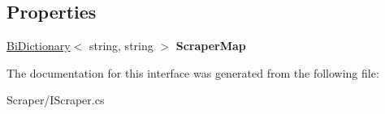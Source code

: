 \subsection*{Properties}
\begin{DoxyCompactItemize}
\item 
\hypertarget{interface_snowflake_1_1_scraper_1_1_i_scraper_a5b576c3bf032e77c6de722139b98cc15}{}\hyperlink{class_snowflake_1_1_utility_1_1_bi_dictionary}{Bi\+Dictionary}$<$ string, string $>$ {\bfseries Scraper\+Map}\label{interface_snowflake_1_1_scraper_1_1_i_scraper_a5b576c3bf032e77c6de722139b98cc15}

\end{DoxyCompactItemize}


The documentation for this interface was generated from the following file\+:\begin{DoxyCompactItemize}
\item 
Scraper/I\+Scraper.\+cs\end{DoxyCompactItemize}
